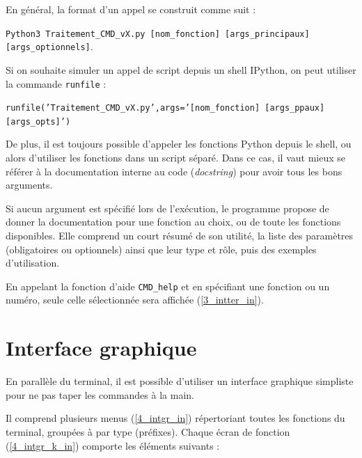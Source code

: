 \documentclass[12pt]{article}
\begin{document}
    En général, la format d'un appel se construit comme suit :
    
    \texttt{Python3 Traitement\_CMD\_vX.py [nom\_fonction] [args\_principaux] [args\_optionnels]}.

    Si on souhaite simuler un appel de script depuis un shell IPython, on peut utiliser la commande \texttt{runfile} :
    
    \texttt{runfile('Traitement\_CMD\_vX.py',args='[nom\_fonction] [args\_ppaux] [args\_opts]')}

    De plus, il est toujours possible d'appeler les fonctions Python depuis le shell, ou alors d'utiliser les fonctions dans un script séparé. Dans ce cas, il vaut mieux se référer à la documentation interne au code (\textit{docstring}) pour avoir tous les bons arguments.
    
    Si aucun argument est spécifié lors de l'exécution, le programme propose de donner la documentation pour une fonction au choix, ou de toute les fonctions disponibles. Elle comprend un court résumé de son utilité, la liste des paramètres (obligatoires ou optionnels) ainsi que leur type et rôle, puis des exemples d'utilisation.

    \label{3_intter_out} En appelant la fonction d'aide \texttt{CMD\_help} et en spécifiant une fonction ou un numéro, seule celle sélectionnée sera affichée (\ref{3_intter_in}).

\newpage
\section{Interface graphique}

    En parallèle du terminal, il est possible d'utiliser un interface graphique simpliste pour ne pas taper les commandes à la main.

    \label{4_intgr_out} \label{4_intgr_k_out} Il comprend plusieurs menus (\ref{4_intgr_in}) répertoriant toutes les fonctions du terminal, groupées à par type (préfixes). Chaque écran de fonction (\ref{4_intgr_k_in}) comporte les éléments suivants :
\end{document}
